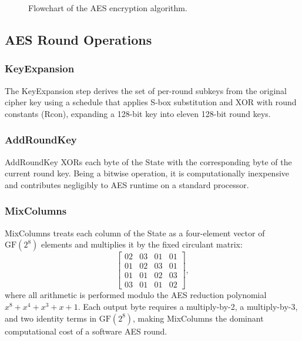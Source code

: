 \begin{figure}[!htb]
    \caption{Flowchart of the AES encryption algorithm.}
    \label{fig:aes_flow}
\end{figure}

\subsection{AES Round Operations}
\label{subsec:aes_rounds}

\subsubsection{KeyExpansion}

The KeyExpansion step derives the set of per-round subkeys from the original cipher
key using a schedule that applies S-box substitution and XOR with round constants
(Rcon), expanding a 128-bit key into eleven 128-bit round keys.

\subsubsection{AddRoundKey}

AddRoundKey XORs each byte of the State with the corresponding byte of the current
round key.
Being a bitwise operation, it is computationally inexpensive and contributes
negligibly to AES runtime on a standard processor.

\subsubsection{MixColumns}

MixColumns treats each column of the State as a four-element vector of $\mathrm{GF}(2^8)$
elements and multiplies it by the fixed circulant matrix:
$$
\begin{bmatrix}
02 & 03 & 01 & 01 \\
01 & 02 & 03 & 01 \\
01 & 01 & 02 & 03 \\
03 & 01 & 01 & 02
\end{bmatrix},
$$
where all arithmetic is performed modulo the AES reduction polynomial
$x^8 + x^4 + x^3 + x + 1$.
Each output byte requires a multiply-by-2, a multiply-by-3, and two identity terms
in $\mathrm{GF}(2^8)$, making MixColumns the dominant computational cost of a
software AES round.

